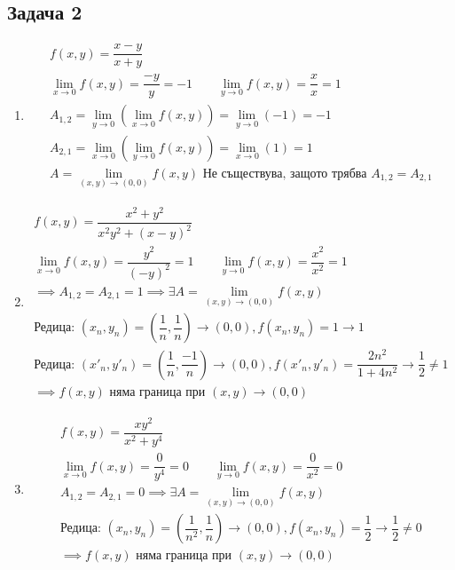 \documentclass[a4paper,fleqn,12pt]{article}
\theoremstyle{definition}
\begin{document}
\subsection*{Задача 2}

\begin{enumerate}
\item 
\begin{gather*}
f(x,y) = \dfrac{x-y}{x+y} \\
\lim\limits_{x \to 0} f(x,y) = \dfrac{-y}{y} = -1 \qquad 
\lim\limits_{y \to 0} f(x,y) = \dfrac{x}{x} = 1 \\
A_{1,2} = \lim\limits_{y \to 0} \left( \lim\limits_{x \to 0} f(x,y) \right) = \lim\limits_{y \to 0} \left( -1 \right) = -1\\
A_{2,1} = \lim\limits_{x \to 0} \left( \lim\limits_{y \to 0} f(x,y) \right) = \lim\limits_{x \to 0} \left( 1 \right) = 1 \\
A = \lim\limits_{(x,y) \to (0,0)} f(x,y) \text{ Не съществува, защото трябва }A_{1,2} = A_{2,1}
\end{gather*}

\item 
\begin{gather*}
f(x,y) = \dfrac{x^2 + y^2}{x^2y^2 + (x - y)^2}\\
\lim\limits_{x \to 0} f(x,y) = \dfrac{y^2}{(-y)^2} = 1 \qquad 
\lim\limits_{y \to 0} f(x,y) = \dfrac{x^2}{x^2} = 1 \\
\implies A_{1,2} = A_{2,1} = 1 \implies \exists A = \lim\limits_{(x,y) \to (0,0)} f(x,y)\\
\text{Редица: }(x_n, y_n) = \left (\dfrac{1}{n},\dfrac{1}{n}\right ) \to (0,0), f(x_n, y_n) = 1 \to 1\\
\text{Редица: }(x'_n, y'_n) = \left (\dfrac{1}{n},\dfrac{-1}{n}\right )  \to (0,0), f(x'_n, y'_n) = \dfrac{2n^2}{1 + 4n^2} \to \dfrac{1}{2} \neq 1 \\
\implies f(x,y) \text{ няма граница при } (x,y) \to (0,0)
\end{gather*}

\item 
\begin{gather*}
f(x,y) = \dfrac{xy^2}{x^2+y^4}\\
\lim\limits_{x \to 0} f(x,y) = \dfrac{0}{y^4} = 0 \qquad 
\lim\limits_{y \to 0} f(x,y) = \dfrac{0}{x^2} = 0 \\
A_{1,2} = A_{2,1} = 0 \implies \exists A = \lim\limits_{(x,y) \to (0,0)} f(x,y) \\
\text{Редица: }(x_n, y_n) = \left ( \dfrac{1}{n^2},\dfrac{1}{n}\right ) \to (0,0), f(x_n, y_n) = \dfrac{1}{2} \to \dfrac{1}{2} \neq 0\\
\implies f(x,y) \text{ няма граница при } (x,y) \to (0,0)
\end{gather*}


\end{enumerate}
\end{document}
